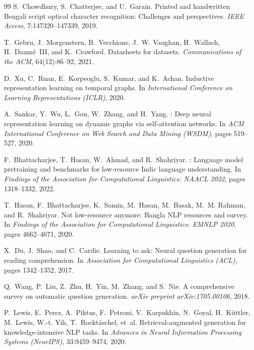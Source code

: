 \documentclass[11pt,a4paper]{article}
\begin{document}
\begin{thebibliography}{99}
S.~Chowdhury, S.~Chatterjee, and U.~Garain.
\newblock Printed and handwritten {Bengali} script optical character recognition: Challenges and perspectives.
\newblock \textsl{IEEE Access}, 7:147320--147339, 2019.

T.~Gebru, J.~Morgenstern, B.~Vecchione, J.~W. Vaughan, H.~Wallach, H.~Daum{\'e}~III, and K.~Crawford.
\newblock Datasheets for datasets.
\newblock \textsl{Communications of the ACM}, 64(12):86--92, 2021.

D.~Xu, C.~Ruan, E.~Korpeoglu, S.~Kumar, and K.~Achan.
\newblock Inductive representation learning on temporal graphs.
\newblock In \textsl{International Conference on Learning Representations (ICLR)}, 2020.

A.~Sankar, Y.~Wu, L.~Gou, W.~Zhang, and H.~Yang.
: Deep neural representation learning on dynamic graphs via self-attention networks.
\newblock In \textsl{ACM International Conference on Web Search and Data Mining (WSDM)}, pages 519--527, 2020.

F.~Bhattacharjee, T.~Hasan, W.~Ahmad, and R.~Shahriyar.
: Language model pretraining and benchmarks for low-resource {Indic} language understanding.
\newblock In \textsl{Findings of the Association for Computational Linguistics: NAACL 2022}, pages 1318--1332, 2022.

T.~Hasan, F.~Bhattacharjee, K.~Samin, M.~Hasan, M.~Basak, M.~M. Rahman, and R.~Shahriyar.
\newblock Not low-resource anymore: {Bangla} {NLP} resources and survey.
\newblock In \textsl{Findings of the Association for Computational Linguistics: EMNLP 2020}, pages 4662--4671, 2020.

X.~Du, J.~Shao, and C.~Cardie.
\newblock Learning to ask: Neural question generation for reading comprehension.
\newblock In \textsl{Association for Computational Linguistics (ACL)}, pages 1342--1352, 2017.

Q.~Wang, P.~Liu, Z.~Zhu, H.~Yin, M.~Zhang, and S.~Nie.
\newblock A comprehensive survey on automatic question generation.
\newblock \textsl{arXiv preprint arXiv:1705.00106}, 2018.

P.~Lewis, E.~Perez, A.~Piktus, F.~Petroni, V.~Karpukhin, N.~Goyal, H.~K{\"u}ttler, M.~Lewis, W.-t. Yih, T.~Rockt{\"a}schel, et~al.
\newblock Retrieval-augmented generation for knowledge-intensive {NLP} tasks.
\newblock In \textsl{Advances in Neural Information Processing Systems (NeurIPS)}, 33:9459--9474, 2020.


\end{thebibliography}
\end{document}
